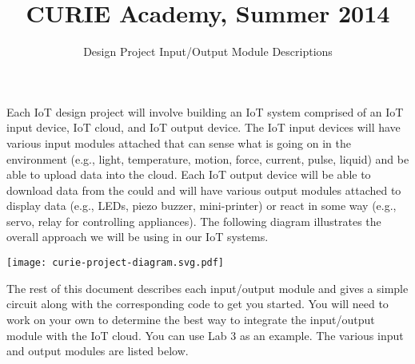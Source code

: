 \documentclass{cbxdoc}
\title{CURIE Academy, Summer 2014}
\subtitle{Design Project Input/Output Module Descriptions}
\makeatletter
\renewcommand\tableofcontents{%
    \@starttoc{toc}%
}
\makeatother
\begin{document}
\maketitle

Each IoT design project will involve building an IoT system comprised of
an IoT input device, IoT cloud, and IoT output device. The IoT input
devices will have various input modules attached that can sense what is
going on in the environment (e.g., light, temperature, motion, force,
current, pulse, liquid) and be able to upload data into the cloud. Each
IoT output device will be able to download data from the could and will
have various output modules attached to display data (e.g., LEDs, piezo
buzzer, mini-printer) or react in some way (e.g., servo, relay for
controlling appliances). The following diagram illustrates the overall
approach we will be using in our IoT systems.

\begin{center}
  \texttt{[image: curie-project-diagram.svg.pdf]}
\end{center}

The rest of this document describes each input/output module and gives a
simple circuit along with the corresponding code to get you started. You
will need to work on your own to determine the best way to integrate the
input/output module with the IoT cloud. You can use Lab 3 as an example.
The various input and output modules are listed below.

\begin{center}\small
 \begin{minipage}{0.8\textwidth}
   \tableofcontents
 \end{minipage}
\end{center}

















\end{document}
